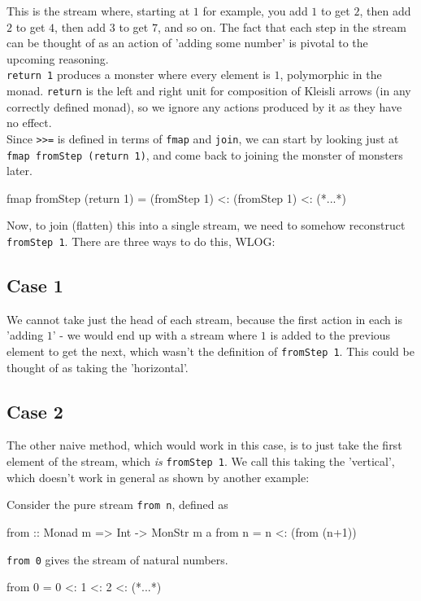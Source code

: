 This is the stream where, starting at $1$ for example, you add $1$ to get $2$, then add $2$ to get $4$, then add $3$ to get $7$, and so on. The fact that each step in the stream can be thought of as an action of 'adding some number' is pivotal to the upcoming reasoning.\\

\verb+return 1+ produces a monster where every element is $1$, polymorphic in the monad. \verb+return+ is the left and right unit for composition of Kleisli arrows (in any correctly defined monad), so we ignore any actions produced by it as they have no effect. \\

Since \verb+>>=+ is defined in terms of \verb+fmap+ and \verb+join+, we can start by looking just at \verb+fmap fromStep (return 1)+, and come back to joining the monster of monsters later.
\begin{haskell}
fmap fromStep (return 1) = (fromStep 1) <: (fromStep 1) <: (*...*)
\end{haskell}

Now, to join (flatten) this into a single stream, we need to somehow reconstruct \verb+fromStep 1+. There are three ways to do this, WLOG:

\subsection{Case 1}
We cannot take just the head of each stream, because the first action in each is 'adding $1$' - we would end up with a stream where $1$ is added to the previous element to get the next, which wasn't the definition of \verb+fromStep 1+. This could be thought of as taking the 'horizontal'. 

\subsection{Case 2}
The other naive method, which would work in this case, is to just take the first element of the stream, which \emph{is} \verb+fromStep 1+. We call this taking the 'vertical', which doesn't work in general as shown by another example:

Consider the pure stream \verb+from n+, defined as
\begin{haskell}
from :: Monad m => Int -> MonStr m a 
from n = n <: (from (n+1))
\end{haskell}

\verb+from 0+ gives the stream of natural numbers.
\begin{haskell}
from 0 = 0 <: 1 <: 2 <: (*...*)
\end{haskell}

